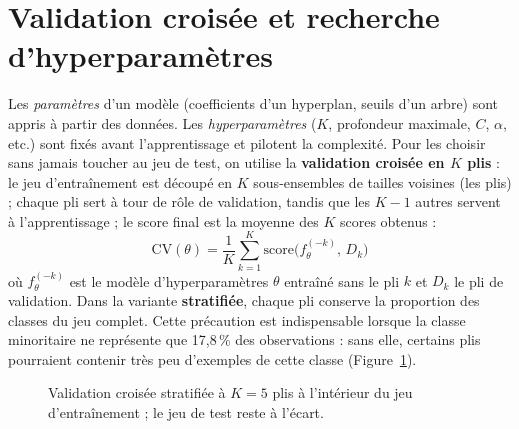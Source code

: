 \documentclass[11pt,a4paper]{report}
\numberwithin{equation}{chapter}
\begin{document}
\section{Validation croisée et recherche d'hyperparamètres}\label{sec:cv}
Les \textit{paramètres} d'un modèle (coefficients d'un hyperplan, seuils d'un arbre) sont appris à partir des données. Les \textit{hyperparamètres} ($K$, profondeur maximale, $C$, $\alpha$, etc.) sont fixés avant l'apprentissage et pilotent la complexité. Pour les choisir sans jamais toucher au jeu de test, on utilise la \textbf{validation croisée en $K$ plis} : le jeu d'entraînement est découpé en $K$ sous-ensembles de tailles voisines (les plis) ; chaque pli sert à tour de rôle de validation, tandis que les $K - 1$ autres servent à l'apprentissage ; le score final est la moyenne des $K$ scores obtenus :
\begin{equation}\label{eq:cv}
\mathrm{CV}(\theta) = \frac{1}{K}\sum_{k=1}^{K} \mathrm{score}\bigl(f_\theta^{(-k)},\, D_k\bigr)
\end{equation}
où $f_\theta^{(-k)}$ est le modèle d'hyperparamètres $\theta$ entraîné sans le pli $k$ et $D_k$ le pli de validation. Dans la variante \textbf{stratifiée}, chaque pli conserve la proportion des classes du jeu complet. Cette précaution est indispensable lorsque la classe minoritaire ne représente que 17,8\,\% des observations : sans elle, certains plis pourraient contenir très peu d'exemples de cette classe (Figure~\ref{fig:cv}).

\begin{figure}[!htbp]
\centering
{}
\caption{Validation croisée stratifiée à $K = 5$ plis à l'intérieur du jeu d'entraînement ; le jeu de test reste à l'écart.}\label{fig:cv}
\end{figure}
\end{document}
